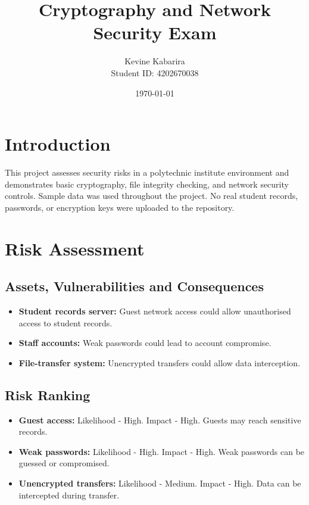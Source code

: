 \documentclass[12pt]{article}
\title{Cryptography and Network Security Exam}
\author{Kevine Kabarira\\
Student ID: 4202670038}
\date{\today}
\begin{document}
\maketitle

\section{Introduction}

This project assesses security risks in a polytechnic institute environment and demonstrates basic cryptography, file integrity checking, and network security controls. Sample data was used throughout the project. No real student records, passwords, or encryption keys were uploaded to the repository.

\section{Risk Assessment}

\subsection{Assets, Vulnerabilities and Consequences}

\begin{itemize}
\item \textbf{Student records server:} Guest network access could allow unauthorised access to student records.
\item \textbf{Staff accounts:} Weak passwords could lead to account compromise.
\item \textbf{File-transfer system:} Unencrypted transfers could allow data interception.
\end{itemize}

\subsection{Risk Ranking}

\begin{itemize}
\item \textbf{Guest access:} Likelihood - High. Impact - High. Guests may reach sensitive records.
\item \textbf{Weak passwords:} Likelihood - High. Impact - High. Weak passwords can be guessed or compromised.
\item \textbf{Unencrypted transfers:} Likelihood - Medium. Impact - High. Data can be intercepted during transfer.
\end{itemize}
\end{document}
